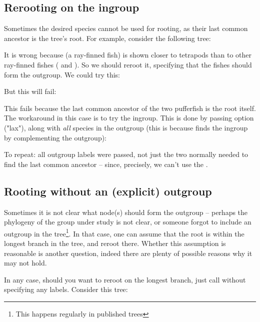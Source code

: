 \subsection{Rerooting on the ingroup}

Sometimes the desired species cannot be used for rooting, as their last common ancestor is the tree's root. For example, consider the following tree:


It is wrong because  (a ray-finned fish) is shown
closer to tetrapods than to other ray-finned fishes ( and
). So we should reroot it, specifying that the fishes should
form the outgroup. We could try this:


But this will fail:


This fails because the last common ancestor of the two pufferfish is
the root itself. The workaround in this case is to try the ingroup. This is
done by passing option  ("lax"), along with {\em all} species in
the outgroup (this is because \reroot{} finds the ingroup by complementing the
outgroup):


To repeat: all outgroup labels were passed, not just the two
normally needed to find the last common ancestor -- since, precisely, we can't
use the \lca.

\subsection[sct:no-outgroup]{Rooting without an (explicit) outgroup}


Sometimes it is not clear what node(s) should form the outgroup --
perhaps the phylogeny of the group under study is not clear, or someone forgot
to include an outgroup in the tree\footnote{This happens regularly in published
trees}. In that case, one can assume that the root is within the longest branch
in the tree, and reroot there. Whether this assumption is reasonable is another
question, indeed there are plenty of possible reasons why it may not hold.

In any case, should you want to reroot on the longest branch, just call
\reroot{} without specifying any labels. Consider this tree:


